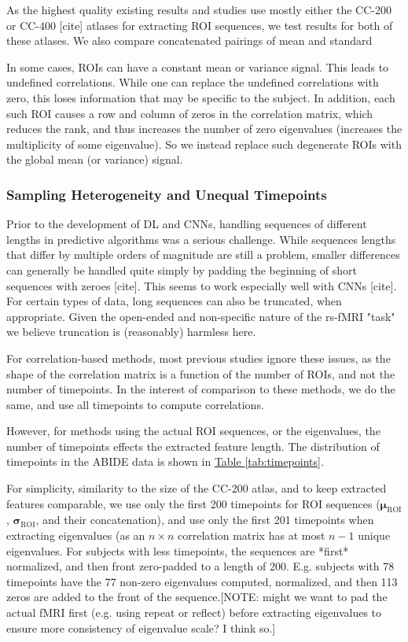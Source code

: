 \documentclass[10pt]{article}
\newcommand{\tsub}[2]{\mathbf{#1}_{\text{#2}}}
\begin{document}
As the highest quality existing results and studies use mostly either the CC-200 or CC-400 [cite] atlases for extracting
ROI sequences, we test results for both of these atlases. We also compare concatenated pairings of mean and standard

In some cases, ROIs can have a constant mean or variance signal. This leads to undefined
correlations. While one can replace the undefined correlations with zero, this loses information
that may be specific to the subject. In addition, each such ROI causes a row and column of zeros in
the correlation matrix, which reduces the rank, and thus increases the number of zero eigenvalues
(increases the multiplicity of some eigenvalue). So we instead replace such degenerate ROIs with the
global mean (or variance) signal.

\subsubsection{Sampling Heterogeneity and Unequal Timepoints}

Prior to the development of DL and CNNs, handling sequences of different lengths in predictive
algorithms was a serious challenge. While sequences lengths that differ by multiple orders of
magnitude are still a problem, smaller differences can generally be handled quite simply by padding
the beginning  of short sequences with zeroes [cite]. This seems to work especially well with CNNs
[cite]. For certain types of data, long sequences can also be truncated, when appropriate. Given the
open-ended and non-specific nature of the rs-fMRI "task" we believe truncation is (reasonably)
harmless here.

For correlation-based methods, most previous studies ignore these issues, as the shape of the
correlation matrix is a function of the number of ROIs, and not the number of timepoints. In the
interest of comparison to these methods, we do the same, and use all timepoints to compute correlations.

However, for methods using the actual ROI sequences, or the eigenvalues, the number of timepoints
effects the extracted feature length. The distribution of timepoints in the ABIDE data is shown in
\hyperref[tab:timepoints]{Table \ref{tab:timepoints}}.

For simplicity, similarity to the size of the CC-200 atlas, and to keep extracted features
comparable, we use only the first 200 timepoints for ROI sequences (\(\tsub{\mu}{ROI}\),
\(\tsub{\sigma}{ROI}\), and their concatenation), and use only the first 201 timepoints when
extracting eigenvalues (as an \(n \times n\) correlation matrix has at most \(n-1\) unique
eigenvalues. For subjects with less timepoints, the sequences are *first* normalized, and then front
zero-padded to a length of 200. E.g. subjects with 78 timepoints have the 77 non-zero eigenvalues
computed, normalized, and then 113 zeros are added to the front of the sequence.[NOTE: might we want
to pad the actual fMRI first (e.g. using repeat or reflect) before extracting eigenvalues to ensure
more consistency of eigenvalue scale? I think so.]
\end{document}
